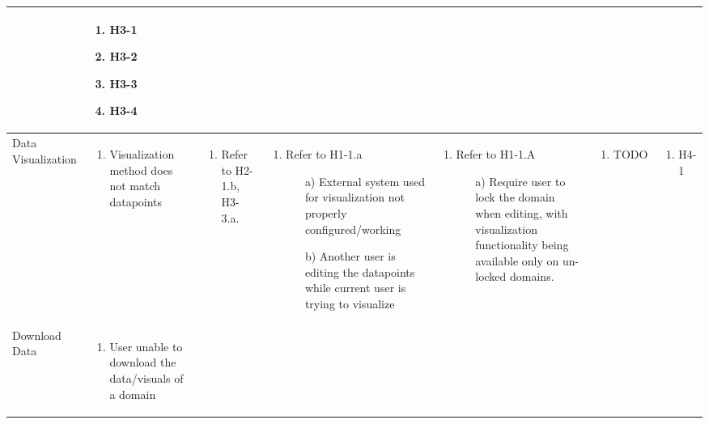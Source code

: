 \documentclass{article}
\begin{document}
\begin{landscape}
\begin{longtable}{|p{3cm}|p{3cm}|p{4cm}|p{4cm}|p{3cm}|p{2cm}|p{3cm}|}
\begin{enumerate}[leftmargin=*]
  \end{enumerate} &
  \begin{enumerate}[leftmargin=*]
    \item H3-1
    \item H3-2
    \item H3-3
    \item H3-4
  \end{enumerate} \\
  \hline
 Data Visualization & 
  \begin{enumerate}[leftmargin=*]
      \item Visualization method does not match datapoints
  \end{enumerate} & 
  \begin{enumerate}[leftmargin=*]
      \item Refer to H2-1.b, H3-3.a.
  \end{enumerate} &
  \begin{enumerate}[leftmargin=*]
    \item Refer to H1-1.a
    \begin{enumerate}
        \item[a)] External system used for visualization not properly configured/working
        \item[b)] Another user is editing the datapoints while current user is trying to visualize
    \end{enumerate}
  \end{enumerate} &
  \begin{enumerate}[leftmargin=*]
    \item Refer to H1-1.A
    \begin{enumerate}
        \item[a)] Require user to lock the domain when editing, with visualization functionality being available only on un-locked domains.
    \end{enumerate}
  \end{enumerate} &
  \begin{enumerate}[leftmargin=*]
       \item TODO
  \end{enumerate} &
  \begin{enumerate}[leftmargin=*]
       \item H4-1
  \end{enumerate} \\
  \hline
 Download Data  & 
  \begin{enumerate}[leftmargin=*]
    \item User unable to download the data/visuals of a domain

\end{enumerate}
\end{longtable}
\end{landscape}
\end{document}
